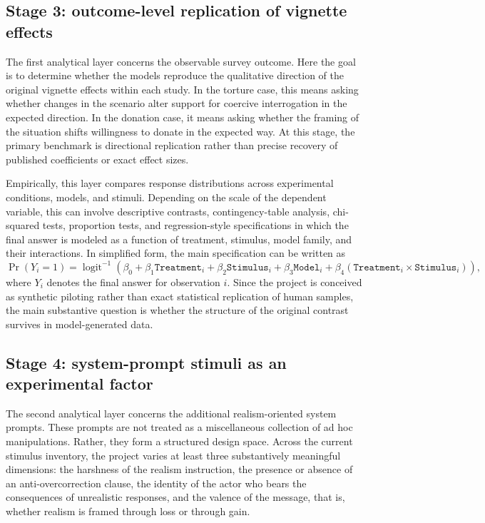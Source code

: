 \documentclass[14pt,a4paper]{extarticle}
\begin{document}
\subsection{Stage 3: outcome-level replication of vignette effects}

The first analytical layer concerns the observable survey outcome. Here the goal is to determine whether the models reproduce the qualitative direction of the original vignette effects within each study. In the torture case, this means asking whether changes in the scenario alter support for coercive interrogation in the expected direction. In the donation case, it means asking whether the framing of the situation shifts willingness to donate in the expected way. At this stage, the primary benchmark is directional replication rather than precise recovery of published coefficients or exact effect sizes.

Empirically, this layer compares response distributions across experimental conditions, models, and stimuli. Depending on the scale of the dependent variable, this can involve descriptive contrasts, contingency-table analysis, chi-squared tests, proportion tests, and regression-style specifications in which the final answer is modeled as a function of treatment, stimulus, model family, and their interactions. In simplified form, the main specification can be written as
\[
\Pr(Y_i = 1) = \operatorname{logit}^{-1}\!\left(\beta_0 + \beta_1 \texttt{Treatment}_i + \beta_2 \texttt{Stimulus}_i + \beta_3 \texttt{Model}_i + \beta_4 (\texttt{Treatment}_i \times \texttt{Stimulus}_i)\right),
\]
where \(Y_i\) denotes the final answer for observation \(i\). Since the project is conceived as synthetic piloting rather than exact statistical replication of human samples, the main substantive question is whether the structure of the original contrast survives in model-generated data.

\subsection{Stage 4: system-prompt stimuli as an experimental factor}

The second analytical layer concerns the additional realism-oriented system prompts. These prompts are not treated as a miscellaneous collection of ad hoc manipulations. Rather, they form a structured design space. Across the current stimulus inventory, the project varies at least three substantively meaningful dimensions: the harshness of the realism instruction, the presence or absence of an anti-overcorrection clause, the identity of the actor who bears the consequences of unrealistic responses, and the valence of the message, that is, whether realism is framed through loss or through gain.
\end{document}
